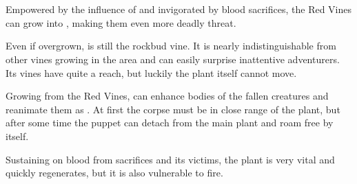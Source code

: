\section{\enemyVineMonsterName}
\label{enemyVineMonster}

Empowered by the influence of \npcSprenVines{} and invigorated by blood sacrifices, the Red Vines can grow into \enemyVineMonster{}, making them even more deadly threat.

Even if overgrown, \enemyVineMonster{} is still the rockbud vine. It is nearly indistinguishable from other vines growing in the area and can easily surprise inattentive adventurers. Its vines have quite a reach, but luckily the plant itself cannot move.

Growing from the Red Vines, \enemyVineMonster{} can enhance bodies of the fallen creatures and reanimate them as \enemyReanimatedRemains{}. At first the corpse must be in close range of the plant, but after some time the puppet can detach from the main plant and roam free by itself.

Sustaining on blood from sacrifices and its victims, the plant is very vital and quickly regenerates, but it is also vulnerable to fire.



{\hfill {} \hfill}

